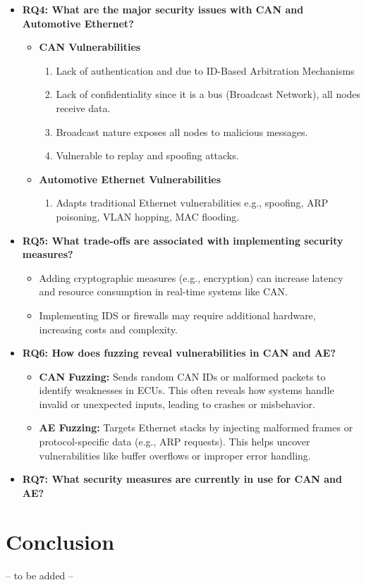 \documentclass{report}
\begin{document}
\begin{itemize}
    \item \textbf{RQ4: What are the major security issues with CAN and Automotive Ethernet?}
        \begin{itemize}
            \item \textbf{CAN Vulnerabilities}
            \begin{enumerate}
                \item Lack of authentication and due to ID-Based Arbitration Mechanisms
                \item Lack of confidentiality since it is a bus (Broadcast Network), all nodes receive data.
                \item Broadcast nature exposes all nodes to malicious messages.
                \item Vulnerable to replay and spoofing attacks.
            \end{enumerate}
        
            \item \textbf{Automotive Ethernet Vulnerabilities}
            \begin{enumerate}
                \item Adapts traditional Ethernet vulnerabilities e.g., spoofing, ARP poisoning, VLAN hopping, MAC flooding.
            \end{enumerate}
        \end{itemize}
        
    \item \textbf{RQ5: What trade-offs are associated with implementing security measures?}
        \begin{itemize}
            \item Adding cryptographic measures (e.g., encryption) can increase latency and resource consumption in real-time systems like CAN.
            \item Implementing IDS or firewalls may require additional hardware, increasing costs and complexity.
        \end{itemize}
        
    \item \textbf{RQ6: How does fuzzing reveal vulnerabilities in CAN and AE?}
        \begin{itemize}
            \item \textbf{CAN Fuzzing:} Sends random CAN IDs or malformed packets to identify weaknesses in ECUs. This often reveals how systems handle invalid or unexpected inputs, leading to crashes or misbehavior.
            \item \textbf{AE Fuzzing:} Targets Ethernet stacks by injecting malformed frames or protocol-specific data (e.g., ARP requests). This helps uncover vulnerabilities like buffer overflows or improper error handling.
        \end{itemize}
        
    \item \textbf{RQ7: What security measures are currently in use for CAN and AE?}    
\end{itemize}


\section{Conclusion}
-- to be added --
\end{document}
